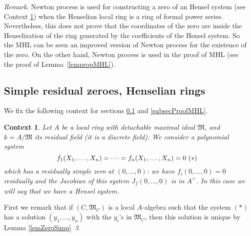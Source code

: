 \documentclass[11pt,a4paper,twoside]{article}
\newtheorem{context}[theorem]{Context}
\newcommand \und[1]{\underline{#1}}
\newcommand \cmatrix[1]{\left[\matrix{#1}\right]}
\newcommand{\gothic}{\mathfrak}
\newcommand{\fM}{{\gothic M}}
\begin{document}
\medskip \noindent \emph{Remark}. Newton process is used for constructing
a zero of an Hensel system (see Context \ref{contextMHL}) when the Henselian local ring is a ring
of formal power series. Nevertheless, this does not prove that the
coordinates of the zero are inside the Henselization of
the ring generated by the coefficients of the Hensel system. So the
MHL can be seen an improved version of Newton process for the existence of the zero.
On the other hand, Newton process is used in the proof of MHL
(see the proof of Lemma~\ref{lempropMHL}). 

\subsection{Simple  residual zeroes, Henselian rings} \label{subsecSRZHR}

We fix the following context for sections \ref{subsecSRZHR} and \ref{subsecProofMHL}.

\begin{context} \label{contextMHL}
Let $A$ be a local ring with detachable maximal ideal $\fM$,   
and $k=A/\fM$
its  residual field (it is a discrete field).
We consider a polynomial
system
$$
f_1(X_1,\dots,X_n) = \cdots = f_n(X_1,\dots,X_n) = 0 ~\relax{(*)}
$$
which has a residually simple zero at $(0,\dots,0)$: we have 
$f_i(0,\dots,0) = 0$ residually and  the Jacobian of this system
$J_{\und f}(0,\dots,0)$ is in $A^{\times}$.
In this case we will say that we have a \emph{Hensel system}.
\end{context}


First we remark that if $(C,\fM_C)$ is a local $A$-algebra such that 
the system $(*)$ has a solution $(y_1,\dots,y_n)$ with the $y_i$'s in $\fM_C$, 
then this solution is unique by Lemma \ref{lemZeroSimp}~\emph{3}. 
\end{document}
